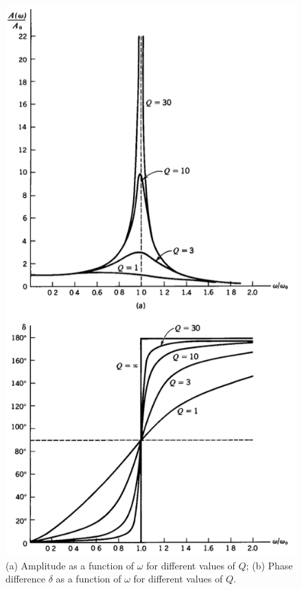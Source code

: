 \begin{fullwidth}
\begin{figure}
	\centering
	\includegraphics[scale=0.6]{phys232/Ch4-A-delta-vs-Q.png} \caption{(a) Amplitude as a function of $\omega$ for different values of $Q$; (b) Phase difference $\delta$ as a function of $\omega$ for different values of $Q$.}	\label{ch4:fig-A-delta-vs-Q}
\end{figure}
\end{fullwidth}

